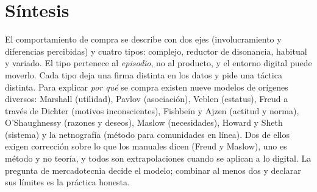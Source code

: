 \section{Síntesis}

El comportamiento de compra se describe con dos ejes (involucramiento y
diferencias percibidas) y cuatro tipos: complejo, reductor de disonancia,
habitual y variado. El tipo pertenece al \emph{episodio}, no al producto, y el
entorno digital puede moverlo. Cada tipo deja una firma distinta en los datos y
pide una táctica distinta. Para explicar \emph{por qué} se compra existen nueve
modelos de orígenes diversos: Marshall (utilidad), Pavlov (asociación), Veblen
(estatus), Freud a través de Dichter (motivos inconscientes), Fishbein y Ajzen
(actitud y norma), O'Shaughnessy (razones y deseos), Maslow (necesidades),
Howard y Sheth (sistema) y la netnografía (método para comunidades en línea).
Dos de ellos exigen corrección sobre lo que los manuales dicen (Freud y Maslow),
uno es método y no teoría, y todos son extrapolaciones cuando se aplican a lo
digital. La pregunta de mercadotecnia decide el modelo; combinar al menos dos y
declarar sus límites es la práctica honesta.


